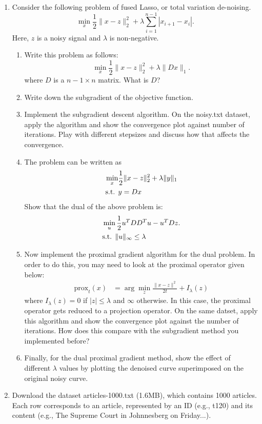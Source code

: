 \documentclass[11pt]{article}
\newcommand{\bi}{\begin{enumerate}}
\newcommand{\ib}{\end{enumerate}}
\newcommand{\p}{\item}
\begin{document}
\begin{enumerate}
\p 
 Consider the following problem of fused Lasso, or total variation de-noising. 
$$\min_x \frac{1}{2}\|x-z\|_2^2+\lambda \sum_{i=1}^{n-1}|x_{i+1}-x_i|.$$
Here, $z$ is a noisy signal and $\lambda$ is non-negative.
\bi
\p Write this problem as follows:
$$\min_x \frac{1}{2}\|x-z\|_2^2+\lambda \|Dx\|_1.$$
where $D$ is a $n-1\times n$ matrix. What is $D$?
\p Write down the subgradient of the objective function. 
\p Implement the subgradient descent algorithm. On the noisy.txt dataset, apply the algorithm and show the convergence plot against number of iterations. Play with different stepsizes and discuss how that affects the convergence.
\p The problem can be written as
\begin{align}
\min_x &\frac{1}{2}\|x-z\|_2^2+\lambda \|y\|_1\notag\\
\mbox{s.t. }& y=Dx
\end{align}
Show that the dual of the above problem is:
\begin{align}
&\min_u \frac{1}{2}u^T DD^Tu-u^TDz.\notag\\
& \mbox{s.t. } \|u\|_\infty\leq \lambda 
\end{align}
\p Now implement the proximal gradient algorithm for the dual problem. In order to do this, you may need to look at the proximal operator given below:
\begin{align*}
\text{prox}_t(x)&=\arg\min_z \frac{\|x-z\|^2}{2t}+I_\lambda(z)
\end{align*}
where $I_\lambda(z)=0$ if $|z|\leq \lambda$ and $\infty$ otherwise. In this case, the proximal operator gets reduced to a projection operator. On the same datset, apply this algorithm and show the convergence plot against the number of iterations. How does this compare with the subgradient method you implemented before?
\p Finally, for the dual proximal gradient method, show the effect of different $\lambda$ values by plotting the denoised curve superimposed on the original noisy curve.
\ib
\iffalse
\p 	 Consider the following two similarity functions for two sets $A$ and $B$. The overlap similarity function:
$$sim_{over}(A,B)=\frac{|A\cap B|}{\min(|A|,|B|)}$$
and the Dice similarity function
$$sim_{dice}(A,B)=\frac{2|A\cap B|}{|A|+|B|}$$
Is there a locality sensitive scheme for these? Prove or give a counter example.
\p Exercises 3.6.3 and 3.6.4 from Chapter 3 of the book “Mining of Massive Datasets.”
\fi
\p Download the dataset articles-1000.txt (1.6MB), which contains 1000 articles. Each row corresponds to an article, represented by an ID (e.g., t120) and its content (e.g., The Supreme Court in Johnnesberg on Friday...).

\end{enumerate}
\end{document}
